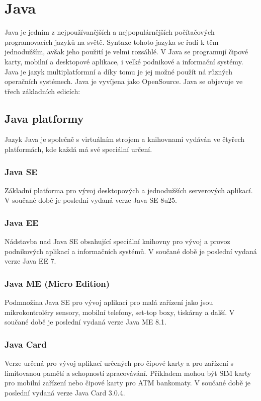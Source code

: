 \section{Java}
Java je jedním z nejpoužívanějších a nejpopulárnějších počítačových programovacích jazyků na světě. Syntaxe tohoto jazyka se řadí k těm jednodužším, avšak jeho použití je velmi rozsáhlé. V Java se programují čipové karty, mobilní a desktopové aplikace, i velké podnikové a informační systémy. Java je jazyk multiplatformní a díky tomu je jej možné použít ná různých operačních systémech. Java je vyvíjena jako OpenSource. Java se objevuje ve třech základních edicích:


\subsection{Java platformy}
Jazyk Java je společně s virtuálním strojem a knihovnami vydáván ve čtyřech platformách, kde každá má své speciální určení.

\subsubsection{Java SE}
Základní platforma pro vývoj desktopových a jednodužších serverových aplikací. V součané době je poslední vydaná verze Java SE 8u25.

\subsubsection{Java EE}
Nádstavba nad Java SE obsahující speciální knihovny pro vývoj a provoz podnikových aplikací a informačních systémů. V součané době je poslední vydaná verze Java EE 7.

\subsubsection{Java ME (Micro Edition)}
Podmnožina Java SE pro vývoj aplikací pro malá zařízení jako jsou mikrokontroléry sensory, mobilní telefony, set-top boxy, tiskárny a další. V součané době je poslední vydaná verze Java ME 8.1.

\subsubsection{Java Card}
Verze určená pro vývoj aplikací určených pro čipové karty a pro zařízení s limitovanou pamětí a schopností zpracovávání. Příkladem mohou být SIM karty pro mobilní zařízení nebo čipové karty pro ATM bankomaty. V součané době je poslední vydaná verze Java Card 3.0.4.

